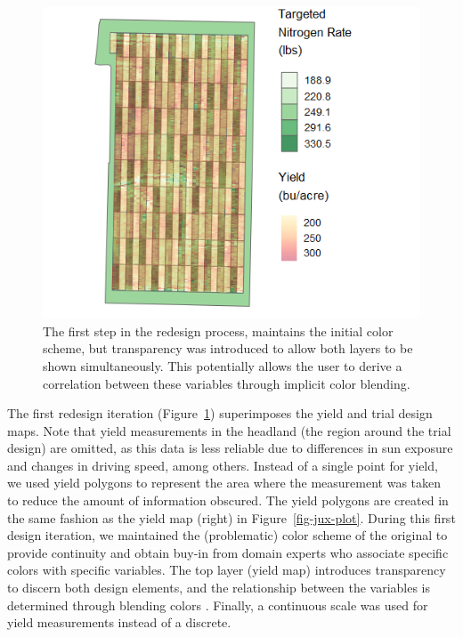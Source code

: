\documentclass[
  authoryear,
  preprint,
  3p]{elsarticle}
\begin{document}
\begin{figure}

{\centering \includegraphics{../images/paper/Attempt1.png}

}

\caption{\label{fig-redesign1}The first step in the redesign process,
maintains the initial color scheme, but transparency was introduced to
allow both layers to be shown simultaneously. This potentially allows
the user to derive a correlation between these variables through
implicit color blending.}

\end{figure}

The first redesign iteration (Figure~\ref{fig-redesign1}) superimposes
the yield and trial design maps. Note that yield measurements in the
headland (the region around the trial design) are omitted, as this data
is less reliable due to differences in sun exposure and changes in
driving speed, among others. Instead of a single point for yield, we
used yield polygons to represent the area where the measurement was
taken to reduce the amount of information obscured. The yield polygons
are created in the same fashion as the yield map (right) in
Figure~\ref{fig-jux-plot}. During this first design iteration, we
maintained the (problematic) color scheme of the original to provide
continuity and obtain buy-in from domain experts who associate specific
colors with specific variables. The top layer (yield map) introduces
transparency to discern both design elements, and the relationship
between the variables is determined through blending colors
\citep{MIDWAY2020100141}. Finally, a continuous scale was used for yield
measurements instead of a discrete.
\end{document}
